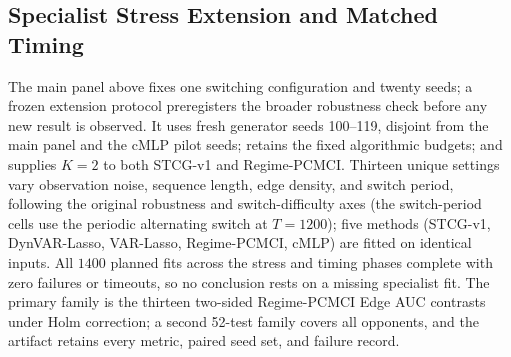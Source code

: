 \documentclass[sigconf,anonymous]{acmart}
\begin{document}
\subsection{Specialist Stress Extension and Matched Timing}
\label{sec:exp-specialist-stress}

The main panel above fixes one switching configuration and twenty seeds; a frozen extension protocol preregisters the broader robustness check before any new result is observed.
It uses fresh generator seeds 100--119, disjoint from the main panel and the cMLP pilot seeds; retains the fixed algorithmic budgets; and supplies $K{=}2$ to both STCG-v1 and Regime-PCMCI.
Thirteen unique settings vary observation noise, sequence length, edge density, and switch period, following the original robustness and switch-difficulty axes (the switch-period cells use the periodic alternating switch at $T{=}1200$); five methods (STCG-v1, DynVAR-Lasso, VAR-Lasso, Regime-PCMCI, cMLP) are fitted on identical inputs.
All $1400$ planned fits across the stress and timing phases complete with zero failures or timeouts, so no conclusion rests on a missing specialist fit.
The primary family is the thirteen two-sided Regime-PCMCI Edge AUC contrasts under Holm correction; a second 52-test family covers all opponents, and the artifact retains every metric, paired seed set, and failure record.

\begin{table}[t]
\caption{Frozen specialist stress extension on fresh seeds 100--119: Edge AUC means (twenty paired seeds per cell) and the STCG-v1 minus Regime-PCMCI difference with 95\% CI. Fifteen displayed cells correspond to thirteen unique input settings; the base row repeats across axes. All $1400$ fits succeeded. After Holm correction over the thirteen primary contrasts, Regime-PCMCI wins at switch periods $150$/$300$ and $T{=}1500$; no cell favors STCG-v1 significantly.}
\label{tab:specialist-stress}
\centering
\small
\resizebox{\linewidth}{!}{}
\end{table}
\end{document}
